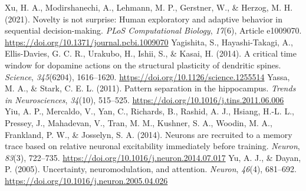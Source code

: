 \documentclass[11pt,a4paper]{article}
\begin{document}
\begin{thebibliography}{}
 Xu, H. A., Modirshanechi, A., Lehmann, M. P., Gerstner, W., \& Herzog, M. H. (2021). Novelty is not surprise: Human exploratory and adaptive behavior in sequential decision-making. \emph{PLoS Computational Biology}, \emph{17}(6), Article e1009070. \url{https://doi.org/10.1371/journal.pcbi.1009070}
 Yagishita, S., Hayashi-Takagi, A., Ellis-Davies, G. C. R., Urakubo, H., Ishii, S., \& Kasai, H. (2014). A critical time window for dopamine actions on the structural plasticity of dendritic spines. \emph{Science}, \emph{345}(6204), 1616--1620. \url{https://doi.org/10.1126/science.1255514}
 Yassa, M. A., \& Stark, C. E. L. (2011). Pattern separation in the hippocampus. \emph{Trends in Neurosciences}, \emph{34}(10), 515--525. \url{https://doi.org/10.1016/j.tins.2011.06.006}
 Yiu, A. P., Mercaldo, V., Yan, C., Richards, B., Rashid, A. J., Hsiang, H.-L. L., Pressey, J., Mahadevan, V., Tran, M. M., Kushner, S. A., Woodin, M. A., Frankland, P. W., \& Josselyn, S. A. (2014). Neurons are recruited to a memory trace based on relative neuronal excitability immediately before training. \emph{Neuron}, \emph{83}(3), 722--735. \url{https://doi.org/10.1016/j.neuron.2014.07.017}
 Yu, A. J., \& Dayan, P. (2005). Uncertainty, neuromodulation, and attention. \emph{Neuron}, \emph{46}(4), 681--692. \url{https://doi.org/10.1016/j.neuron.2005.04.026}
\end{thebibliography}
\end{document}
